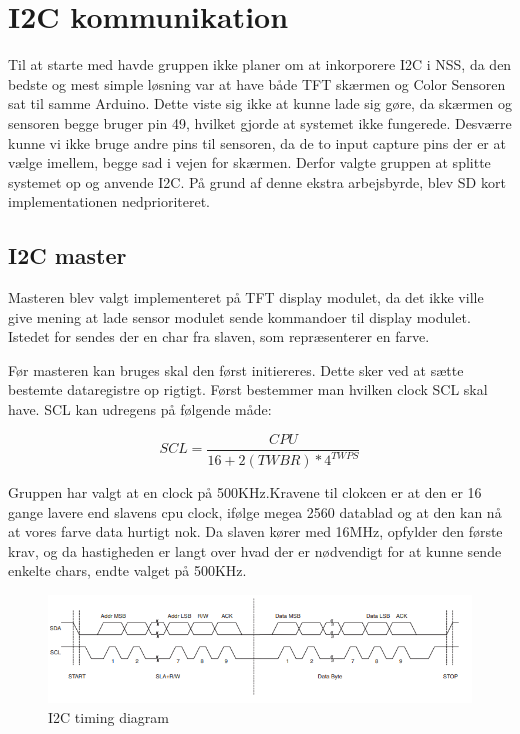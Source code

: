 \graphicspath{{Chapters/Test/}}


\section{I2C kommunikation}
Til at starte med havde gruppen ikke planer om at inkorporere I2C i NSS, da den bedste og mest simple løsning var at have både TFT skærmen og Color Sensoren sat til samme Arduino. Dette viste sig ikke at kunne lade sig gøre, da skærmen og sensoren begge bruger pin 49, hvilket gjorde at systemet ikke fungerede. Desværre kunne vi ikke bruge andre pins til sensoren, da de to input capture pins der er at vælge imellem, begge sad i vejen for skærmen. Derfor valgte gruppen at splitte systemet op og anvende I2C. På grund af denne ekstra arbejsbyrde, blev SD kort implementationen nedprioriteret.

\subsection{I2C master}
Masteren blev valgt implementeret på TFT display modulet, da det ikke ville give mening at lade sensor modulet sende kommandoer til display modulet. Istedet for sendes der en char fra slaven, som repræsenterer en farve.

Før masteren kan bruges skal den først initiereres. Dette sker ved at sætte bestemte dataregistre op rigtigt. Først bestemmer man hvilken clock SCL skal have. SCL kan udregens på følgende måde:

\begin{equation}
SCL= \frac{CPU}{16+2(TWBR)*4^{TWPS}} 
\end{equation}

Gruppen har valgt at en clock på 500KHz.Kravene til clokcen er at den er 16 gange lavere end slavens cpu clock, ifølge megea 2560 datablad og at den kan nå at vores farve data hurtigt nok. Da slaven kører med 16MHz, opfylder den første krav, og da hastigheden er langt over hvad der er nødvendigt for at kunne sende enkelte chars, endte valget på 500KHz. 

\begin{figure}[H]
	\centering
	\includegraphics[width = 450pt]{Img/I2CTiming.png}
	\caption{I2C timing diagram}
	\label{fig:I2CTIming}
\end{figure}

